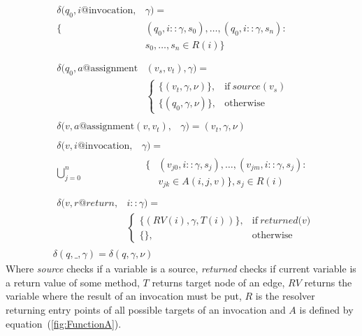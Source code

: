 \begin{equation}
	\label{fig:TransitionRelation}
	\begin{split}
		&\begin{split}
			\delta(q_0, i@\textrm{invocation}, & \gamma) = \\
			\{& (q_0, i::\gamma, s_0), \ldots, (q_0, i::\gamma, s_n): \\
			& s_0, \ldots, s_n \in R(i)\} \\
		\end{split} \\
		&\begin{split}
			\delta(q_0, a@\textrm{assignment} & (v_s, v_t), \gamma) = \\
			&\begin{cases}
				\{(v_t, \gamma, \nu)\},& \textrm{if}\ \textit{source}(v_s) \\
				\{(q_0, \gamma, \nu)\},& \textrm{otherwise}
			\end{cases}
		\end{split} \\
		&\begin{split}
			\delta(v, a@\textrm{assignment}(v, v_t), & \gamma) = {(v_t, \gamma, \nu)}
		\end{split} \\
		&\begin{split}
			\delta(v, i@\textrm{invocation}, & \gamma) = \\
			\bigcup_{j=0}^{n} 
			&\begin{split}
				\{&(v_{j0}, i::\gamma, s_j), \ldots, (v_{jm}, i::\gamma, s_j): \\
				& v_{jk} \in A(i, j, v)\}, s_j \in R(i)
			\end{split}
		\end{split} \\
		&\begin{split}
			\delta(v, r@return, &i::\gamma) = \\
			&\begin{cases}
				\{(RV(i), \gamma, T(i))\},& \textrm{if}\ \textit{returned(v)} \\
				\{\}, & \textrm{otherwise}
			\end{cases}
		\end{split} \\
		&\delta(q, \_, \gamma) = \delta(q, \gamma, \nu)
	\end{split}
\end{equation}
Where \textit{source} checks if a variable is a source, \textit{returned} checks if current variable is a return value of some method, $T$ returns target node of an edge, $RV$ returns the variable where the result of an invocation must be put, $R$ is the resolver returning entry points of all possible targets of an invocation and $A$ is defined by equation~(\ref{fig:FunctionA}).
